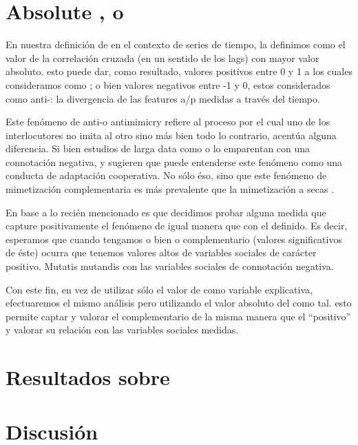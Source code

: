 

\section{Absolute \entrainment, o \disentrainment}

En nuestra definición de \entrainment en el contexto de series de tiempo, la definimos como el valor de la correlación cruzada (en un sentido de los lags) con mayor valor absoluto. esto puede dar, como resultado, valores positivos entre 0 y 1 a los cuales consideramos como \entrainment; o bien valores negativos entre -1 y 0, estos considerados como anti-\entrainment: la divergencia de las features a/p medidas a través del tiempo.

Este fenómeno de anti-\entrainment o antimimicry \cite{CHAR1999} refiere al proceso por el cual uno de los interlocutores no imita al otro sino más bien todo lo contrario, acentúa alguna diferencia. Si bien estudios de larga data como \cite{bourhis1973language} o \cite{dabbs1969similarity} lo emparentan con una connotación negativa, \cite{healey2014divergence} y \cite{levitan2015acoustic} sugieren que puede entenderse este fenómeno como una conducta de adaptación cooperativa. No sólo éso, sino que este fenómeno de mimetización complementaria es más prevalente que la mimetización a secas \cite{levitan2015acoustic}.

En base a lo recién mencionado es que decidimos probar alguna medida que capture positivamente el fenómeno de igual manera que con el \entrainment definido. Es decir, esperamos que cuando tengamos o bien \entrainment o \entrainment complementario (valores significativos de éste) ocurra que tenemos valores altos de variables sociales de carácter positivo. Mutatis mutandis con las variables sociales de connotación negativa.

Con este fin, en vez de utilizar sólo el valor de \entrainment como variable explicativa, efectuaremos el mismo análisis pero utilizando el valor absoluto del \entrainment como tal. esto permite captar y valorar el \entrainment complementario de la misma manera que el ``positivo'' y valorar su relación con las variables sociales medidas.

\section{Resultados sobre \absentrainment}


\section{Discusión}

